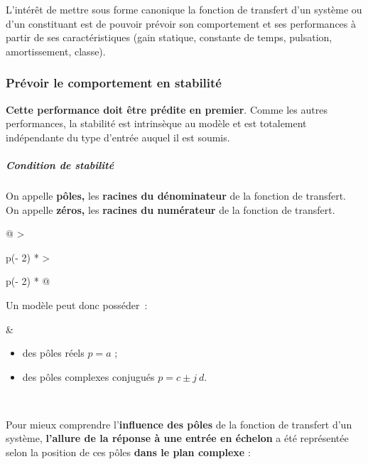 L'intérêt de mettre sous forme canonique la fonction de transfert d'un système ou d'un constituant est de pouvoir prévoir son comportement et ses performances à partir de ses caractéristiques (gain statique, constante de temps, pulsation, amortissement, classe).

\hypertarget{pruxe9voir-le-comportement-en-stabilituxe9}{%
\subsubsection{Prévoir le comportement en stabilité}\label{pruxe9voir-le-comportement-en-stabilituxe9}}

\textbf{Cette performance doit être prédite en premier}. Comme les autres performances, la stabilité est intrinsèque au modèle et est totalement indépendante du type d'entrée auquel il est soumis.

\hypertarget{condition-de-stabilituxe9}{%
\subparagraph*{Condition de stabilité}\label{condition-de-stabilituxe9}}

On appelle \textbf{pôles,} les \textbf{racines du dénominateur} de la fonction de transfert.\\
On appelle \textbf{zéros,} les \textbf{racines du numérateur} de la fonction de transfert.

\begin{longtable}[]{@{}
  >{\raggedright\arraybackslash}p{(\columnwidth - 2\tabcolsep) * }
  >{\raggedright\arraybackslash}p{(\columnwidth - 2\tabcolsep) * }@{}}
\toprule\noalign{}
\begin{minipage}[b]{\linewidth}\raggedright
Un modèle peut donc posséder~:
\end{minipage} & \begin{minipage}[b]{\linewidth}\raggedright
\begin{itemize}
\item
  des pôles réels \(p = a\) ;
\item
  des pôles complexes conjugués \(p = c \pm j\ d\).
\end{itemize}
\end{minipage} \\
\midrule\noalign{}
\endhead
\bottomrule\noalign{}
\endlastfoot
\end{longtable}

Pour mieux comprendre l'\textbf{influence des pôles} de la fonction de transfert d'un système, \textbf{l'allure de la réponse à une entrée en échelon} a été représentée selon la position de ces pôles \textbf{dans le plan complexe} :


